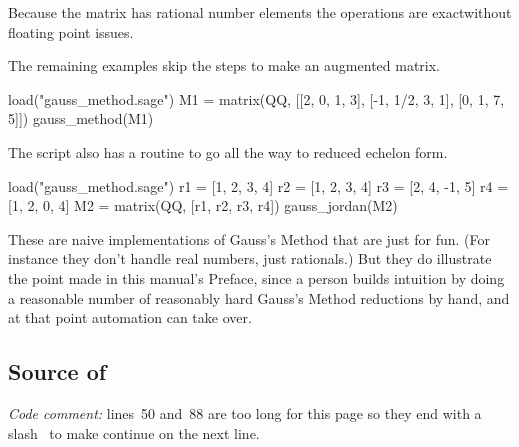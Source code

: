 Because the matrix has rational number elements the operations are 
exact\Dash without floating point issues.

The remaining examples skip the steps to make an augmented matrix. 
\begin{sageoutput}[d,0,1]
load("gauss_method.sage")
M1 = matrix(QQ, [[2, 0, 1, 3], [-1, 1/2, 3, 1], [0, 1, 7, 5]])
gauss_method(M1)
\end{sageoutput}

The script also has a routine to go all the way to reduced echelon form.
\begin{sageoutput}[d,0,1]
load("gauss_method.sage")
r1 = [1, 2, 3, 4]
r2 = [1, 2, 3, 4]
r3 = [2, 4, -1, 5]
r4 = [1, 2, 0, 4]
M2 = matrix(QQ, [r1, r2, r3, r4])
gauss_jordan(M2)            
\end{sageoutput}

These are naive implementations of Gauss's Method that are just for fun.
(For instance they don't handle real numbers, just rationals.)
But they do illustrate the point made in this manual's Preface, 
since a person
builds intuition by doing a reasonable number of reasonably hard Gauss's Method
reductions by hand, and at that point automation can take over.


\subsection{Source of \protect{}}
\textit{Code comment:} lines~50 and~88 are too long
for this page so they end with a 
slash~\inlinecode{\\} to make \python{} continue on the
next line. 


\endinput


TODO:
